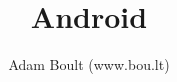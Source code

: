 \documentclass[oneside]{book}
\begin{document}
\author{Adam Boult (www.bou.lt)}
\title{Android}
\maketitle

\setcounter{tocdepth}{0}
\tableofcontents


\end{document}
